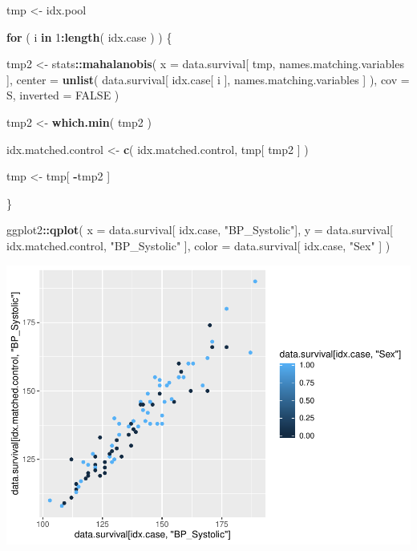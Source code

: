 \documentclass[]{article}
\newenvironment{Shaded}{\begin{snugshade}}{\end{snugshade}}
\newcommand{\ControlFlowTok}[1]{\textcolor[rgb]{0.13,0.29,0.53}{\textbf{#1}}}
\newcommand{\DataTypeTok}[1]{\textcolor[rgb]{0.13,0.29,0.53}{#1}}
\newcommand{\DecValTok}[1]{\textcolor[rgb]{0.00,0.00,0.81}{#1}}
\newcommand{\KeywordTok}[1]{\textcolor[rgb]{0.13,0.29,0.53}{\textbf{#1}}}
\newcommand{\NormalTok}[1]{#1}
\newcommand{\OperatorTok}[1]{\textcolor[rgb]{0.81,0.36,0.00}{\textbf{#1}}}
\newcommand{\OtherTok}[1]{\textcolor[rgb]{0.56,0.35,0.01}{#1}}
\newcommand{\StringTok}[1]{\textcolor[rgb]{0.31,0.60,0.02}{#1}}
\begin{document}
\begin{Shaded}
\begin{Highlighting}[]
\NormalTok{tmp <-}\StringTok{ }\NormalTok{idx.pool}
  
\ControlFlowTok{for}\NormalTok{ ( i }\ControlFlowTok{in} \DecValTok{1}\OperatorTok{:}\KeywordTok{length}\NormalTok{( idx.case ) ) \{}
  
\NormalTok{  tmp2 <-}\StringTok{ }
\StringTok{    }\NormalTok{stats}\OperatorTok{::}\KeywordTok{mahalanobis}\NormalTok{( }
      \DataTypeTok{x =}\NormalTok{ data.survival[ tmp, names.matching.variables ], }
      \DataTypeTok{center =} \KeywordTok{unlist}\NormalTok{( data.survival[ idx.case[ i ], names.matching.variables ] ),}
      \DataTypeTok{cov =}\NormalTok{ S,}
      \DataTypeTok{inverted =} \OtherTok{FALSE}
\NormalTok{    )}
  
\NormalTok{  tmp2 <-}\StringTok{ }\KeywordTok{which.min}\NormalTok{( tmp2 )}
  
\NormalTok{  idx.matched.control <-}\StringTok{ }\KeywordTok{c}\NormalTok{( idx.matched.control, tmp[ tmp2 ] )}
  
\NormalTok{  tmp <-}\StringTok{ }\NormalTok{tmp[ }\OperatorTok{-}\NormalTok{tmp2 ]}
  
\NormalTok{\}}

\NormalTok{ggplot2}\OperatorTok{::}\KeywordTok{qplot}\NormalTok{( }
  \DataTypeTok{x =}\NormalTok{ data.survival[ idx.case, }\StringTok{"BP_Systolic"}\NormalTok{], }
  \DataTypeTok{y =}\NormalTok{ data.survival[ idx.matched.control, }\StringTok{"BP_Systolic"}\NormalTok{ ], }
  \DataTypeTok{color =}\NormalTok{ data.survival[ idx.case, }\StringTok{"Sex"}\NormalTok{ ]}
\NormalTok{)}
\end{Highlighting}
\end{Shaded}

\includegraphics{0033_PROFIL--Metabolomics_files/figure-latex/RA-Matched-Subset-1.pdf}
\end{document}
